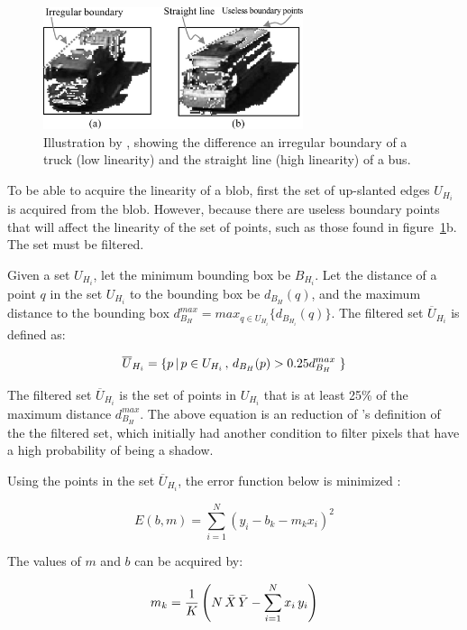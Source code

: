 \documentclass[conference]{IEEEtran}
\begin{document}
\begin{figure}[!ht]
\centering
\includegraphics[width=3in]{linearity.png}
\caption{Illustration by \cite{Jun-Wei}, showing the difference an irregular boundary of a truck (low linearity) and the straight line (high linearity) of a bus.}
\label{fig_linearity}
\end{figure}

To be able to acquire the linearity of a blob, first the set of up-slanted edges $U_{H_i}$ is acquired from the blob. However, because there are useless boundary points that will affect the linearity of the set of points, such as those found in figure~\ref{fig_linearity}b. The set must be filtered.

Given a set $U_{H_i}$, let the minimum bounding box be $B_{H_i}$. Let the distance of a point $q$ in the set $U_{H_i}$ to the bounding box be $d_{B_H} (q)$, and the maximum distance to the bounding box $d_{B_H}^{max} = max_{q \in U_{H_i}} \lbrace d_{B_{H_i}} (q) \rbrace $. The filtered set $\overline{U}_{H_i}$ is defined as:

$$
\overline{U}_{H_i} = \lbrace p \thinspace | \thinspace p \in U_{H_i} \thinspace , \thinspace d_{B_H}(p) > 0.25 d_{B_H}^{max} \thinspace \thinspace \rbrace
$$

The filtered set $\overline{U}_{H_i}$ is the set of points in $U_{H_i}$ that is at least 25\% of the maximum distance $d_{B_H}^{max}$. The above equation is an reduction of \cite{Jun-Wei}'s definition of the the filtered set, which initially had another condition to filter pixels that have a high probability of being a shadow.


Using the points in the set $\overline{U}_{H_i}$, the error function below is minimized \cite{Math}:

$$
E(b, m) = \sum_{i=1}^{N}(y_i - b_k - m_k x_i)^2
$$

The values of $m$ and $b$ can be acquired by:

$$
m_k = \frac{1}{K} \left( N \thinspace \bar{X} \thinspace \bar{Y} - \sum_{i=1}^{N} x_i \thinspace y_i \right)
$$
\end{document}

